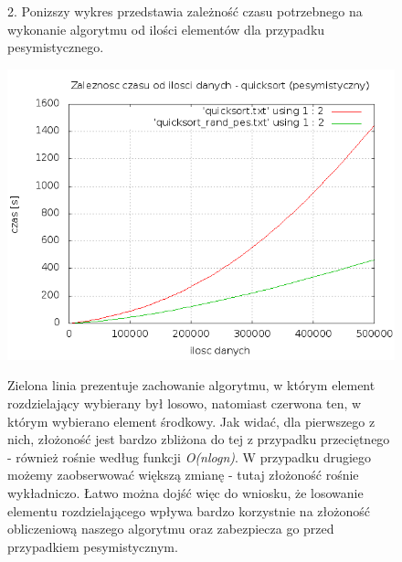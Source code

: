 \documentclass[a4paper,11pt]{report}
\begin{document}
\begin{figure}
  2. Ponizszy wykres przedstawia zależność czasu potrzebnego na wykonanie algorytmu od ilości elementów dla przypadku pesymistycznego.
\begin{center}\includegraphics[scale=0.55]{./quicksort_pes.png}\end{center}
    Zielona linia prezentuje zachowanie algorytmu, w którym element rozdzielający wybierany był losowo, natomiast czerwona ten, w którym wybierano element środkowy. Jak widać, dla pierwszego z nich, złożoność jest bardzo zbliżona do tej z przypadku przeciętnego - również rośnie według funkcji \emph{O(nlogn)}. W przypadku drugiego możemy zaobserwować większą zmianę - tutaj złożoność rośnie wykładniczo. Łatwo można dojść więc do wniosku, że losowanie elementu rozdzielającego wpływa bardzo korzystnie na złożoność obliczeniową naszego algorytmu oraz zabezpiecza go przed przypadkiem pesymistycznym.
\end{figure}
\end{document}

